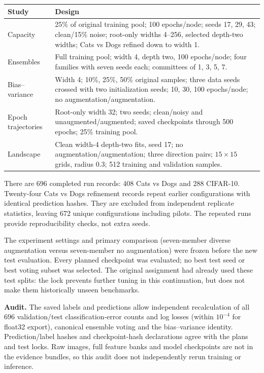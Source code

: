 \documentclass[11pt,a4paper]{article}
\begin{document}
\begin{center}\small\begin{tabular}{p{34mm}p{116mm}}\toprule
Study & Design\\\midrule
Capacity & 25\% of original training pool; 100 epochs/node; seeds 17, 29, 43; clean/15\% noise; root-only widths 4--256, selected depth-two widths; Cats vs Dogs refined down to width 1.\\
Ensembles & Full training pool; width 4, depth two, 100 epochs/node; four families with seven seeds each; committees of 1, 3, 5, 7.\\
Bias--variance & Width 4; 10\%, 25\%, 50\% original samples; three data seeds crossed with two initialization seeds; 10, 30, 100 epochs/node; no augmentation/augmentation.\\
Epoch trajectories & Root-only width 32; two seeds; clean/noisy and unaugmented/augmented; saved checkpoints through 500 epochs; 25\% training pool.\\
Landscape & Clean width-4 depth-two fits, seed 17; no augmentation/augmentation; three direction pairs; $15\times15$ grids, radius 0.3; 512 training and validation samples.\\\bottomrule
\end{tabular}\end{center}

There are 696 completed run records: 408 Cats vs Dogs and 288 CIFAR-10. Twenty-four Cats vs Dogs refinement records repeat earlier configurations with identical prediction hashes. They are excluded from independent replicate statistics, leaving 672 unique configurations including pilots. The repeated runs provide reproducibility checks, not extra seeds.

The experiment settings and primary comparison (seven-member diverse augmentation versus seven-member no augmentation) were frozen before the new test evaluation. Every planned checkpoint was evaluated; no best test seed or best voting subset was selected. The original assignment had already used these test splits: the lock prevents further tuning in this continuation, but does not make them historically unseen benchmarks.

\textbf{Audit.} The saved labels and predictions allow independent recalculation of all 696 validation/test classification-error counts and log losses (within $10^{-4}$ for float32 export), canonical ensemble voting and the bias--variance identity. Prediction/label hashes and checkpoint-hash declarations agree with the plans and test locks. Raw images, full feature banks and model checkpoints are not in the evidence bundles, so this audit does not independently rerun training or inference.
\end{document}

